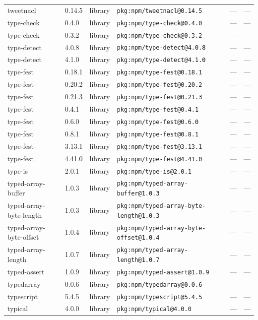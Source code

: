 \documentclass[11pt]{article}
\begin{document}
\begin{longtable}{|l|l|l|p{2.2cm}|l|p{4cm}|}
tweetnacl & 0.14.5 & library & \texttt{pkg:npm/tweetnacl@0.14.5} & — & — \\
type-check & 0.4.0 & library & \texttt{pkg:npm/type-check@0.4.0} & — & — \\
type-check & 0.3.2 & library & \texttt{pkg:npm/type-check@0.3.2} & — & — \\
type-detect & 4.0.8 & library & \texttt{pkg:npm/type-detect@4.0.8} & — & — \\
type-detect & 4.1.0 & library & \texttt{pkg:npm/type-detect@4.1.0} & — & — \\
type-fest & 0.18.1 & library & \texttt{pkg:npm/type-fest@0.18.1} & — & — \\
type-fest & 0.20.2 & library & \texttt{pkg:npm/type-fest@0.20.2} & — & — \\
type-fest & 0.21.3 & library & \texttt{pkg:npm/type-fest@0.21.3} & — & — \\
type-fest & 0.4.1 & library & \texttt{pkg:npm/type-fest@0.4.1} & — & — \\
type-fest & 0.6.0 & library & \texttt{pkg:npm/type-fest@0.6.0} & — & — \\
type-fest & 0.8.1 & library & \texttt{pkg:npm/type-fest@0.8.1} & — & — \\
type-fest & 3.13.1 & library & \texttt{pkg:npm/type-fest@3.13.1} & — & — \\
type-fest & 4.41.0 & library & \texttt{pkg:npm/type-fest@4.41.0} & — & — \\
type-is & 2.0.1 & library & \texttt{pkg:npm/type-is@2.0.1} & — & — \\
typed-array-buffer & 1.0.3 & library & \texttt{pkg:npm/typed-array-buffer@1.0.3} & — & — \\
typed-array-byte-length & 1.0.3 & library & \texttt{pkg:npm/typed-array-byte-length@1.0.3} & — & — \\
typed-array-byte-offset & 1.0.4 & library & \texttt{pkg:npm/typed-array-byte-offset@1.0.4} & — & — \\
typed-array-length & 1.0.7 & library & \texttt{pkg:npm/typed-array-length@1.0.7} & — & — \\
typed-assert & 1.0.9 & library & \texttt{pkg:npm/typed-assert@1.0.9} & — & — \\
typedarray & 0.0.6 & library & \texttt{pkg:npm/typedarray@0.0.6} & — & — \\
typescript & 5.4.5 & library & \texttt{pkg:npm/typescript@5.4.5} & — & — \\
typical & 4.0.0 & library & \texttt{pkg:npm/typical@4.0.0} & — & — \\

\end{longtable}
\end{document}

